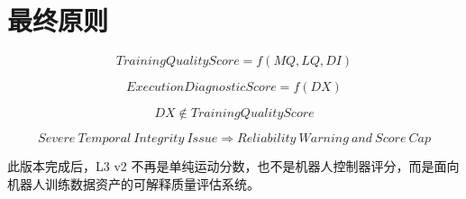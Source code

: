 \documentclass[UTF8,zihao=-4,oneside,openany]{ctexrep}
\begin{document}
\section{最终原则}

\[
TrainingQualityScore=f(MQ,LQ,DI)
\]

\[
ExecutionDiagnosticScore=f(DX)
\]

\[
DX\notin TrainingQualityScore
\]

\[
Severe\ Temporal\ Integrity\ Issue\Rightarrow Reliability\ Warning\ and\ Score\ Cap
\]

此版本完成后，L3 v2 不再是单纯运动分数，也不是机器人控制器评分，而是面向机器人训练数据资产的可解释质量评估系统。

\clearpage
\end{document}
